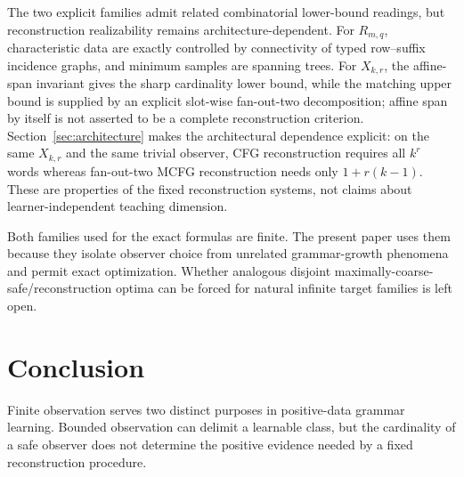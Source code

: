 \documentclass[11pt]{article}
\theoremstyle{definition}
\theoremstyle{remark}
\begin{document}
The two explicit families admit related combinatorial lower-bound readings,
but reconstruction realizability remains architecture-dependent.  For
\(R_{m,q}\), characteristic data are exactly controlled by connectivity of
typed row--suffix incidence graphs, and minimum samples are spanning trees.
For \(X_{k,r}\), the affine-span invariant gives the sharp cardinality lower
bound, while the matching upper bound is supplied by an explicit slot-wise
fan-out-two decomposition; affine span by itself is not asserted to be a
complete reconstruction criterion.  Section~\ref{sec:architecture} makes the
architectural dependence explicit: on the same \(X_{k,r}\) and the same
trivial observer, CFG reconstruction requires all \(k^r\) words whereas
fan-out-two MCFG reconstruction needs only \(1+r(k-1)\).  These are
properties of the fixed reconstruction systems, not claims about
learner-independent teaching dimension.

Both families used for the exact formulas are finite.  The present paper uses
them because they isolate observer choice from unrelated grammar-growth
phenomena and permit exact optimization.  Whether analogous disjoint
maximally-coarse-safe/reconstruction optima can be forced for natural infinite target
families is left open.

\section{Conclusion}

Finite observation serves two distinct purposes in positive-data grammar
learning.  Bounded observation can delimit a learnable class, but the
cardinality of a safe observer does not determine the positive evidence needed
by a fixed reconstruction procedure.
\end{document}
